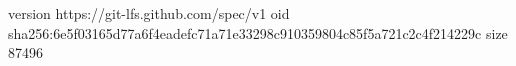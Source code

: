 version https://git-lfs.github.com/spec/v1
oid sha256:6e5f03165d77a6f4eadefc71a71e33298c910359804c85f5a721c2c4f214229c
size 87496
